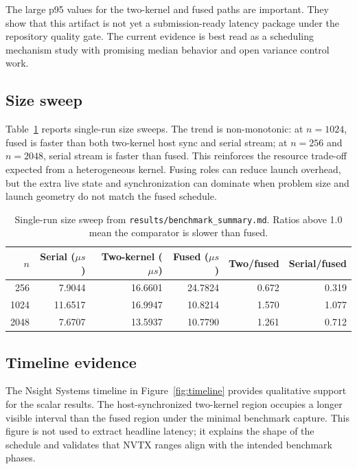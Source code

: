 \documentclass[11pt]{article}
\begin{document}
The large p95 values for the two-kernel and fused paths are important. They show that this artifact is not yet a submission-ready latency package under the repository quality gate. The current evidence is best read as a scheduling mechanism study with promising median behavior and open variance control work.

\subsection{Size sweep}
Table~\ref{tab:size} reports single-run size sweeps. The trend is non-monotonic: at \(n=1024\), fused is faster than both two-kernel host sync and serial stream; at \(n=256\) and \(n=2048\), serial stream is faster than fused. This reinforces the resource trade-off expected from a heterogeneous kernel. Fusing roles can reduce launch overhead, but the extra live state and synchronization can dominate when problem size and launch geometry do not match the fused schedule.

\begin{table}[t]
\centering
\caption{Single-run size sweep from \texttt{results/benchmark\_summary.md}. Ratios above 1.0 mean the comparator is slower than fused.}
\label{tab:size}
\begin{tabular}{rrrrrr}
\toprule
\(n\) & Serial (\(\mu s\)) & Two-kernel (\(\mu s\)) & Fused (\(\mu s\)) & Two/fused & Serial/fused \\
\midrule
256 & 7.9044 & 16.6601 & 24.7824 & 0.672 & 0.319 \\
1024 & 11.6517 & 16.9947 & 10.8214 & 1.570 & 1.077 \\
2048 & 7.6707 & 13.5937 & 10.7790 & 1.261 & 0.712 \\
\bottomrule
\end{tabular}
\end{table}

\subsection{Timeline evidence}
The Nsight Systems timeline in Figure~\ref{fig:timeline} provides qualitative support for the scalar results. The host-synchronized two-kernel region occupies a longer visible interval than the fused region under the minimal benchmark capture. This figure is not used to extract headline latency; it explains the shape of the schedule and validates that NVTX ranges align with the intended benchmark phases.
\end{document}
